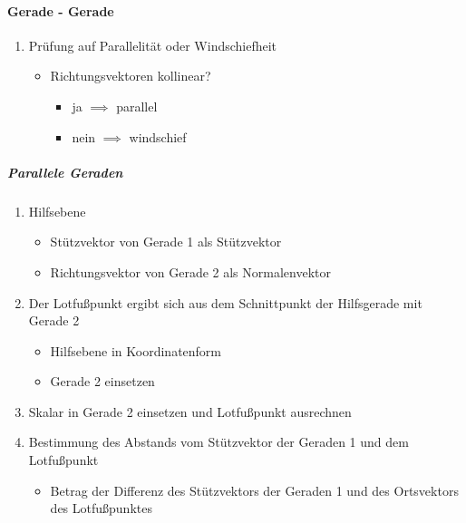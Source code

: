 \documentclass{article}
\begin{document}
  \paragraph{Gerade - Gerade}
  \begin{enumerate}
  	\item Prüfung auf Parallelität oder Windschiefheit
  	\begin{itemize}
  		\item Richtungsvektoren kollinear? 
  		\begin{itemize}
  			\item ja $\implies$ parallel
  			\item nein $\implies$ windschief
  		\end{itemize}
  	\end{itemize}
  \end{enumerate}
  
  \subparagraph{Parallele Geraden}
  \begin{enumerate}
  	\item Hilfsebene
  	\begin{itemize}
  		\item Stützvektor von Gerade 1 als Stützvektor
  		\item Richtungsvektor von Gerade 2 als Normalenvektor
  	\end{itemize}
  	\item Der Lotfußpunkt ergibt sich aus dem Schnittpunkt der Hilfsgerade mit Gerade 2
  	\begin{itemize}
  		\item Hilfsebene in Koordinatenform
  		\item Gerade 2 einsetzen
  	\end{itemize}
  	\item Skalar in Gerade 2 einsetzen und Lotfußpunkt ausrechnen
  	\item Bestimmung des Abstands vom Stützvektor der Geraden 1 und dem Lotfußpunkt
  	\begin{itemize}
  		\item Betrag der Differenz des Stützvektors der Geraden 1 und des Ortsvektors des Lotfußpunktes
  	\end{itemize}
  \end{enumerate}
  
\end{document}
